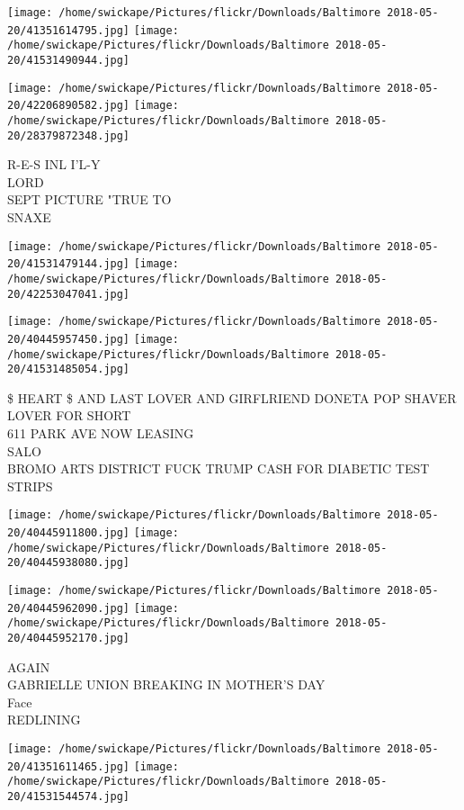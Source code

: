 \documentclass[10pt,letterpaper]{article}
\begin{document}
\texttt{[image: /home/swickape/Pictures/flickr/Downloads/Baltimore 2018-05-20/41351614795.jpg]}
\texttt{[image: /home/swickape/Pictures/flickr/Downloads/Baltimore 2018-05-20/41531490944.jpg]}

\texttt{[image: /home/swickape/Pictures/flickr/Downloads/Baltimore 2018-05-20/42206890582.jpg]}
\texttt{[image: /home/swickape/Pictures/flickr/Downloads/Baltimore 2018-05-20/28379872348.jpg]}

R{-}E{-}S INL I'L{-}Y\\
LORD\\
SEPT PICTURE "TRUE TO\\
SNAXE
\pagebreak

\texttt{[image: /home/swickape/Pictures/flickr/Downloads/Baltimore 2018-05-20/41531479144.jpg]}
\texttt{[image: /home/swickape/Pictures/flickr/Downloads/Baltimore 2018-05-20/42253047041.jpg]}

\texttt{[image: /home/swickape/Pictures/flickr/Downloads/Baltimore 2018-05-20/40445957450.jpg]}
\texttt{[image: /home/swickape/Pictures/flickr/Downloads/Baltimore 2018-05-20/41531485054.jpg]}

\$ HEART \$ AND LAST LOVER AND GIRFLRIEND DONETA POP SHAVER LOVER FOR SHORT\\
611 PARK AVE NOW LEASING\\
SALO\\
BROMO ARTS DISTRICT FUCK TRUMP CASH FOR DIABETIC TEST STRIPS
\pagebreak

\texttt{[image: /home/swickape/Pictures/flickr/Downloads/Baltimore 2018-05-20/40445911800.jpg]}
\texttt{[image: /home/swickape/Pictures/flickr/Downloads/Baltimore 2018-05-20/40445938080.jpg]}

\texttt{[image: /home/swickape/Pictures/flickr/Downloads/Baltimore 2018-05-20/40445962090.jpg]}
\texttt{[image: /home/swickape/Pictures/flickr/Downloads/Baltimore 2018-05-20/40445952170.jpg]}

AGAIN\\
GABRIELLE UNION BREAKING IN MOTHER'S DAY\\
Face\\
REDLINING
\pagebreak

\texttt{[image: /home/swickape/Pictures/flickr/Downloads/Baltimore 2018-05-20/41351611465.jpg]}
\texttt{[image: /home/swickape/Pictures/flickr/Downloads/Baltimore 2018-05-20/41531544574.jpg]}
\end{document}
